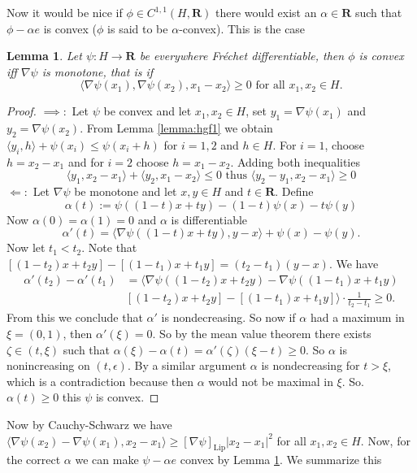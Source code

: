 \documentclass[a4paper,11pt, leqno]{scrreprt} %
\renewcommand{\leq}{\leqslant}
\renewcommand{\leq}{\leqslant}
\renewcommand{\geq}{\geqslant}
\newcommand{\R}{\mathbf R}
\theoremstyle{change}
\newcounter{acounter}[chapter]
\newtheorem{lemma}[acounter]{Lemma}
\theoremstyle{nonumberplain}
\newtheorem{proof}{Proof}
\begin{document}
Now it would be nice if $\phi \in C^{1,1}(H, \R)$ there would exist an $\alpha \in \R$ such that $\phi - \alpha e$ is convex ($\phi$ is said to be $\alpha$-convex). This is the case
\begin{lemma}\label{lemma:monotone}
Let $\psi: H \to \R$ be everywhere Fr\'echet differentiable, then $\phi$ is convex iff $\nabla \psi$ is monotone, that is if
\[
\langle \nabla \psi(x_1), \nabla \psi(x_2), x_1 - x_2 \rangle \geq 0 \text{ for all $x_1, x_2 \in H$}.
\]
\end{lemma}

\begin{proof}
$\implies:$ Let $\psi$ be convex and let $x_1, x_2 \in H$, set $y_1 = \nabla \psi(x_1)$ and $y_2 = \nabla \psi(x_2)$. From Lemma \ref{lemma:hgf1} we obtain $\langle y_i, h \rangle + \psi(x_i) \leq \psi(x_i + h)$ for $i = 1,2$ and $h \in H$. For $i = 1$, choose $h = x_2 - x_1$ and for $i = 2$ choose $h = x_1 - x_2$. Adding both inequalities
\[
\langle y_1, x_2 - x_1 \rangle + \langle y_2, x_1 - x_2 \rangle \leq 0 \text{ thus } \langle y_2 - y_1, x_2 - x_1 \rangle \geq 0
\]
$\Leftarrow:$ Let $\nabla \psi$ be monotone and let $x,y \in H$ and $t \in \R$. Define
\[
\alpha(t) := \psi((1 - t)x + ty) - (1 - t) \psi(x) - t \psi(y)
\]
Now $\alpha(0) = \alpha(1) = 0$ and $\alpha$ is differentiable
\[
\alpha'(t) = \langle \nabla \psi((1 - t)x + ty), y - x \rangle + \psi(x) - \psi(y).
\]
Now let $t_1 < t_2$. Note that $[(1 - t_2)x + t_2 y] - [(1 - t_1)x + t_1 y] = (t_2 - t_1)(y - x)$. We have
\begin{equation}
\begin{split}
\alpha'(t_2) - \alpha'(t_1) &= \langle \nabla \psi((1 - t_2)x + t_2 y) - \nabla \psi((1 - t_1)x + t_1y)\\
 &[(1 - t_2)x + t_2 y] - [(1 - t_1)x + t_1 y] \rangle \cdot \frac{1}{t_2 - t_1} \geq 0.
\end{split}
\end{equation}
From this we conclude that $\alpha'$ is nondecreasing. So now if $\alpha$ had a maximum in $\xi = (0,1)$, then $\alpha'(\xi) = 0$. So by the mean value theorem there exists $\zeta \in (t, \xi)$ such that $\alpha(\xi) - \alpha(t) = \alpha'(\zeta)(\xi - t) \geq 0$. So $\alpha$ is nonincreasing on $(t, \epsilon)$. By a similar argument $\alpha$ is nondecreasing for $t > \xi$, which is a contradiction because then $\alpha$ would not be maximal in $\xi$. So. $\alpha(t) \geq 0$ this $\psi$ is convex.
\end{proof}

Now by Cauchy-Schwarz we have $\langle \nabla \psi(x_2) - \nabla \psi(x_1), x_2 - x_1 \rangle \geq [\nabla \psi]_\text{Lip} |x_2 - x_1|^2$ for all $x_1, x_2 \in H$. Now, for the correct $\alpha$ we can make $\psi - \alpha e$ convex by Lemma \ref{lemma:monotone}. We summarize this
\end{document}
